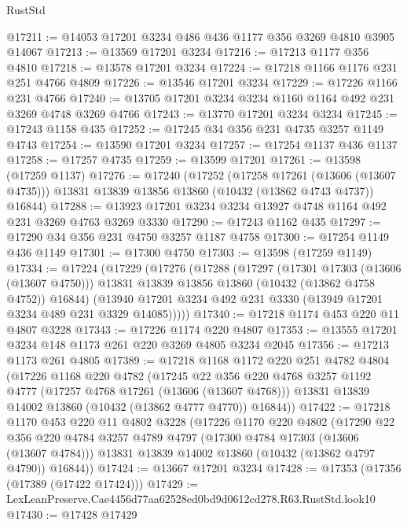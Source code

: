 \begin{lexlean}{RustStd}
\begin{coremodule}
@17211 := @14053 @17201 @3234 @486 @436 @1177 @356 @3269 @4810 @3905 @14067
@17213 := @13569 @17201 @3234
@17216 := @17213 @1177 @356 @4810
@17218 := @13578 @17201 @3234
@17224 := @17218 @1166 @1176 @231 @251 @4766 @4809
@17226 := @13546 @17201 @3234
@17229 := @17226 @1166 @231 @4766
@17240 := @13705 @17201 @3234 @3234 @1160 @1164 @492 @231 @3269 @4748 @3269 @4766
@17243 := @13770 @17201 @3234 @3234
@17245 := @17243 @1158 @435
@17252 := @17245 @34 @356 @231 @4735 @3257 @1149 @4743
@17254 := @13590 @17201 @3234
@17257 := @17254 @1137 @436 @1137
@17258 := @17257 @4735
@17259 := @13599 @17201
@17261 := @13598 (@17259 @1137)
@17276 := @17240
    (@17252
      (@17258 @17261 (@13606 (@13607 @4735)))
      @13831
      @13839
      @13856
      @13860
      (@10432 (@13862 @4743 @4737))
      @16844)
@17288 := @13923 @17201 @3234 @3234 @13927 @4748 @1164 @492 @231 @3269 @4763 @3269 @3330
@17290 := @17243 @1162 @435
@17297 := @17290 @34 @356 @231 @4750 @3257 @1187 @4758
@17300 := @17254 @1149 @436 @1149
@17301 := @17300 @4750
@17303 := @13598 (@17259 @1149)
@17334 := @17224
    (@17229
      (@17276
        (@17288
          (@17297
            (@17301 @17303 (@13606 (@13607 @4750)))
            @13831
            @13839
            @13856
            @13860
            (@10432 (@13862 @4758 @4752))
            @16844)
          (@13940 @17201 @3234 @492 @231 @3330 (@13949 @17201 @3234 @489 @231 @3329 @14085)))))
@17340 := @17218 @1174 @453 @220 @11 @4807 @3228
@17343 := @17226 @1174 @220 @4807
@17353 := @13555 @17201 @3234 @148 @1173 @261 @220 @3269 @4805 @3234 @2045
@17356 := @17213 @1173 @261 @4805
@17389 := @17218
    @1168
    @1172
    @220
    @251
    @4782
    @4804
    (@17226
      @1168
      @220
      @4782
      (@17245
        @22
        @356
        @220
        @4768
        @3257
        @1192
        @4777
        (@17257 @4768 @17261 (@13606 (@13607 @4768)))
        @13831
        @13839
        @14002
        @13860
        (@10432 (@13862 @4777 @4770))
        @16844))
@17422 := @17218
    @1170
    @453
    @220
    @11
    @4802
    @3228
    (@17226
      @1170
      @220
      @4802
      (@17290
        @22
        @356
        @220
        @4784
        @3257
        @4789
        @4797
        (@17300 @4784 @17303 (@13606 (@13607 @4784)))
        @13831
        @13839
        @14002
        @13860
        (@10432 (@13862 @4797 @4790))
        @16844))
@17424 := @13667 @17201 @3234
@17428 := @17353 (@17356 (@17389 (@17422 @17424)))
@17429 := LexLeanPreserve.Cae4456d77aa62528ed0bd9d0612cd278.R63.RustStd.look10
@17430 := @17428 @17429

\end{coremodule}
\end{lexlean}
